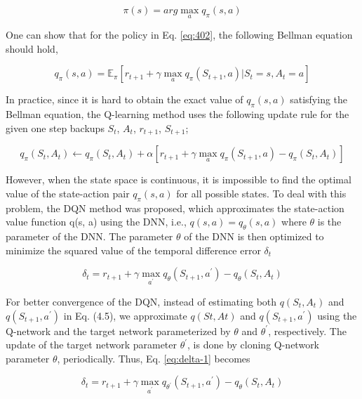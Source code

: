 \begin{equation} \label{eq:402}
\pi(s) = arg \max_a q_{\pi} (s, a) 
\end{equation}

One can show that for the policy in Eq. \ref{eq:402}, the following Bellman equation should hold,

\begin{equation}
q_\pi(s,a) = \mathbb{E}_\pi [r_{t+1} + \gamma \max_a q_\pi(S_{t+1},a) | S_t = s, A_t = a]
\end{equation}

In practice, since it is hard to obtain the exact value of $q_{\pi}(s, a)$ satisfying the Bellman equation, the Q-learning method uses the following update rule for the given one step backups $S_t$, $A_t$, $r_{t+1}$, $S_{t+1}$;

\begin{equation}
q_\pi(S_t,A_t) \gets q_\pi(S_t,A_t) + \alpha \left[r_{t+1} + \gamma \max_a q_\pi(S_{t+1},a) - q_\pi(S_t,A_t)\right]
\end{equation}

However, when the state space is continuous, it is impossible to find the optimal value of the state-action pair $q_{\pi} (s, a)$ for all possible states. To deal with this problem, the DQN method was proposed, which approximates the state-action value function q(s, a) using the DNN, i.e., $q(s, a) = q_\theta(s, a)$ where $\theta$ is the parameter of the DNN. The parameter $\theta$ of the DNN is then optimized to minimize the squared value of the temporal difference error $\delta_t$

\begin{equation} \label{eq:delta-1}
\delta_t = r_{t+1} + \gamma \max_{a^ \prime} q_\theta(S_{t+1},a^ \prime) - q_\theta(S_t,A_t)
\end{equation}

For better convergence of the DQN, instead of estimating both $q(S_t,A_t)$ and $q(S_{t+1},a^ \prime)$ in  Eq. (4.5), we approximate $q(St,At)$ and $q(S_{t+1},a^ \prime)$ using the Q-network and the target network parameterized by $\theta$ and $\theta^{\prime}$, respectively. The update of the target network parameter $\theta^{\prime}$, is done by cloning Q-network parameter $\theta$, periodically. Thus, Eq. \ref{eq:delta-1} becomes

\begin{equation}
\delta_t = r_{t+1} + \gamma \max_{a^ \prime} q_{\theta^{\prime}}(S_{t+1},a^ \prime) - q_\theta(S_t,A_t)
\end{equation}

